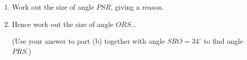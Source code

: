 \begin{question}
\begin{enumerate}
    \item[(b)] Work out the size of angle $PSR$, giving a reason.

    \vspace{3cm}

    \item[(c)] Hence work out the size of angle $ORS$... 

    (Use your answer to part (b) together with angle $SRO = 34^\circ$ to find angle $PRS$.)

    \vspace{3cm}
\end{enumerate}
\end{question}